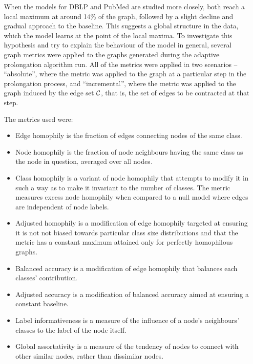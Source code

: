 When the models for DBLP and PubMed are studied more closely, both reach a local maximum at around 14\% of the graph, followed by a slight decline and gradual approach to the baseline. This suggests a global structure in the data, which the model learns at the point of the local maxima. To investigate this hypothesis and try to explain the behaviour of the model in general, several graph metrics were applied to the graphs generated during the adaptive prolongation algorithm run. All of the metrics were applied in two scenarios -- \enquote{absolute}, where the metric was applied to the graph at a particular step in the prolongation process, and \enquote{incremental}, where the metric was applied to the graph induced by the edge set \( \mathcal{C} \), that is, the set of edges to be contracted at that step.

The metrics used were:
\begin{itemize}
  \item Edge homophily \cite{zhu_beyond_2020} is the fraction of edges connecting nodes of the same class.
  \item Node homophily \cite{pei_geom-gcn_2020} is the fraction of node neighbours having the same class as the node in question, averaged over all nodes.
  \item Class homophily \cite{lim_large_2021} is a variant of node homophily that attempts to modify it in such a way as to make it invariant to the number of classes. The metric measures excess node homophily when compared to a null model where edges are independent of node labels.
  \item Adjusted homophily \cite{platonov_characterizing_2022} is a modification of edge homophily targeted at ensuring it is not not biased towards particular class size distributions and that the metric has a constant maximum attained only for perfectly homophilous graphs.
  \item Balanced accuracy \cite{platonov_characterizing_2022} is a modification of edge homophily that balances each classes' contribution.
  \item Adjusted accuracy \cite{platonov_characterizing_2022} is a modification of balanced accuracy aimed at ensuring a constant baseline.
  \item Label informativeness \cite{platonov_characterizing_2022} is a measure of the influence of a node's neighbours' classes to the label of the node itself.
  \item Global assortativity \cite{newman_mixing_2003} is a measure of the tendency of nodes to connect with other similar nodes, rather than dissimilar nodes.
\end{itemize}


